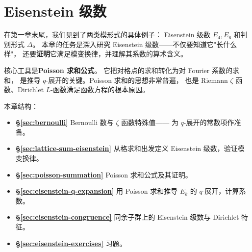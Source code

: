 \chapter{Eisenstein 级数}
\label{ch:eisenstein}

在第一章末尾，我们见到了两类模形式的具体例子：
Eisenstein 级数 $E_4, E_6$ 和判别形式 $\Delta$。
本章的任务是深入研究 Eisenstein 级数——不仅要知道它"长什么样"，
还要\textbf{证明}它满足模变换律，并理解其系数的算术含义。

核心工具是\textbf{Poisson 求和公式}。
它把对格点的求和转化为对 Fourier 系数的求和，
是推导 $q$-展开的关键。Poisson 求和的思想非常普遍，
也是 Riemann $\zeta$ 函数、Dirichlet $L$-函数满足函数方程的根本原因。

本章结构：
\begin{itemize}
  \item \textbf{§\ref{sec:bernoulli}} Bernoulli 数与 $\zeta$ 函数特殊值——
    为 $q$-展开的常数项作准备。
  \item \textbf{§\ref{sec:lattice-sum-eisenstein}}
    从格求和出发定义 Eisenstein 级数，验证模变换律。
  \item \textbf{§\ref{sec:poisson-summation}}
    Poisson 求和公式及其证明。
  \item \textbf{§\ref{sec:eisenstein-q-expansion}}
    用 Poisson 求和推导 $E_k$ 的 $q$-展开，计算系数。
  \item \textbf{§\ref{sec:eisenstein-congruence}}
    同余子群上的 Eisenstein 级数与 Dirichlet 特征。
  \item \textbf{§\ref{sec:eisenstein-exercises}} 习题。
\end{itemize}









